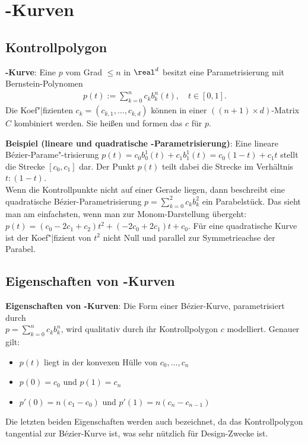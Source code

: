 \chapter{%
    -Kurven%
}

\section{%
    Kontrollpolygon%
}

\textbf{-Kurve}:
Eine  $p$ vom Grad $\le n$ in $\real^d$ besitzt eine Parametrisierung
mit Bernstein-Polynomen
\begin{align*}
    p(t) := \sum_{k=0}^n c_k b_k^n(t),\quad
    t \in [0, 1].
\end{align*}
Die Koef"|fizienten $c_k = (c_{k,1}, \dotsc, c_{k,d})$ können in einer $((n + 1) \times d)$-Matrix
$C$ kombiniert werden.
Sie heißen  und formen das  $c$ für $p$.

\linie

\textbf{Beispiel (lineare und quadratische -Parametrisierung)}:
Eine lineare Bézier-Parame"-trisierung $p(t) = c_0 b_0^1(t) + c_1 b_1^1(t) = c_0 (1 - t) + c_1 t$
stellt die Strecke $[c_0, c_1]$ dar.
Der Punkt $p(t)$ teilt dabei die Strecke im Verhältnis $t : (1 - t)$.\\
Wenn die Kontrollpunkte nicht auf einer Gerade liegen, dann beschreibt eine quadratische
Bézier-Parametrisierung $p = \sum_{k=0}^2 c_k b_k^2$ ein Parabelstück.
Das sieht man am einfachsten, wenn man zur Monom-Darstellung übergeht:
$p(t) = (c_0 - 2c_1 + c_2)t^2 + (-2c_0 + 2c_1)t + c_0$.
Für eine quadratische Kurve ist der Koef"|fizient von $t^2$ nicht Null und parallel zur
Symmetrieachse der Parabel.

\section{%
    Eigenschaften von -Kurven%
}

\textbf{Eigenschaften von -Kurven}:
Die Form einer Bézier-Kurve, parametrisiert durch\\
$p = \sum_{k=0}^n c_k b_k^n$, wird qualitativ durch ihr Kontrollpolygon $c$ modelliert.
Genauer gilt:
\begin{itemize}
    \item
    $p(t)$ liegt in der konvexen Hülle von $c_0, \dotsc, c_n$

    \item
    $p(0) = c_0$ und $p(1) = c_n$

    \item
    $p'(0) = n(c_1 - c_0)$ und $p'(1) = n(c_n - c_{n-1})$
\end{itemize}
Die letzten beiden Eigenschaften werden auch  bezeichnet,
da das Kontrollpolygon tangential zur Bézier-Kurve ist, was sehr nützlich für Design-Zwecke ist.

